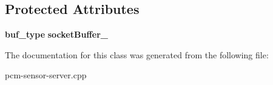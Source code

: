 \subsection*{Protected Attributes}
\begin{DoxyCompactItemize}
\item 
\mbox{\label{classbasic__socketstream_a404ff48f3ad5e5d508f8af6252d7449d}} 
\textbf{ buf\+\_\+type} {\bfseries socket\+Buffer\+\_\+}
\end{DoxyCompactItemize}


The documentation for this class was generated from the following file\+:\begin{DoxyCompactItemize}
\item 
pcm-\/sensor-\/server.\+cpp\end{DoxyCompactItemize}
